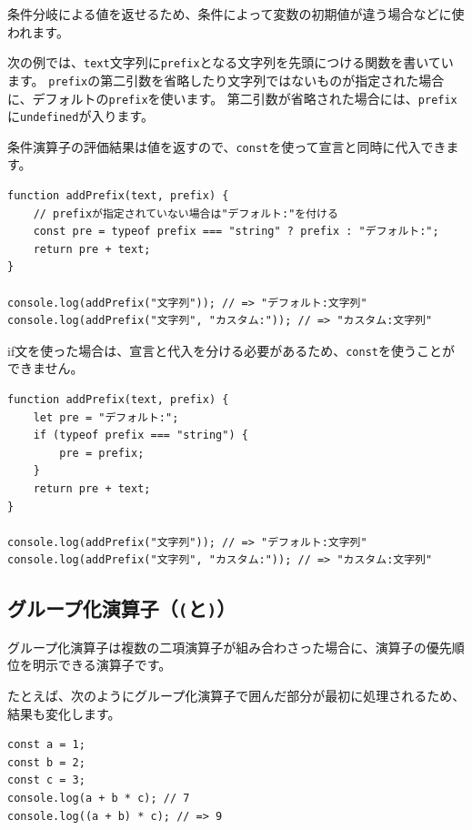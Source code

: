 条件分岐による値を返せるため、条件によって変数の初期値が違う場合などに使われます。

次の例では、\texttt{text}文字列に\texttt{prefix}となる文字列を先頭につける関数を書いています。
\texttt{prefix}の第二引数を省略したり文字列ではないものが指定された場合に、デフォルトの\texttt{prefix}を使います。
第二引数が省略された場合には、\texttt{prefix}に\texttt{undefined}が入ります。

条件演算子の評価結果は値を返すので、\texttt{const}を使って宣言と同時に代入できます。

\begin{lstlisting}
function addPrefix(text, prefix) {
    // prefixが指定されていない場合は"デフォルト:"を付ける
    const pre = typeof prefix === "string" ? prefix : "デフォルト:";
    return pre + text;
}

console.log(addPrefix("文字列")); // => "デフォルト:文字列"
console.log(addPrefix("文字列", "カスタム:")); // => "カスタム:文字列"
\end{lstlisting}

if文を使った場合は、宣言と代入を分ける必要があるため、\texttt{const}を使うことができません。

\begin{lstlisting}
function addPrefix(text, prefix) {
    let pre = "デフォルト:";
    if (typeof prefix === "string") {
        pre = prefix;
    }
    return pre + text;
}

console.log(addPrefix("文字列")); // => "デフォルト:文字列"
console.log(addPrefix("文字列", "カスタム:")); // => "カスタム:文字列"
\end{lstlisting}


\hypertarget{group-operator}{%
\subsection{\texorpdfstring{グループ化演算子（\texttt{(}と\texttt{)}）}{グループ化演算子（(と)）}}\label{group-operator}}

グループ化演算子は複数の二項演算子が組み合わさった場合に、演算子の優先順位を明示できる演算子です。

たとえば、次のようにグループ化演算子で囲んだ部分が最初に処理されるため、結果も変化します。

\begin{lstlisting}
const a = 1;
const b = 2;
const c = 3;
console.log(a + b * c); // 7
console.log((a + b) * c); // => 9
\end{lstlisting}

